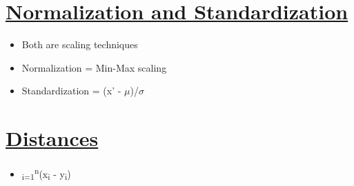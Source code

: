 \documentclass[11pt]{article}
\begin{document}
\section{\underline{Normalization and Standardization}}
\label{sec:org8e8afef}

\begin{itemize}
\item Both are scaling techniques
\item Normalization = Min-Max scaling
\item Standardization = (x' - \(\mu\))/\(\sigma\)
\end{itemize}

\section{\underline{Distances}}
\label{sec:org3299ef2}

\begin{itemize}
\item \Sum\textsubscript{i=1}\textsuperscript{n}(x\textsubscript{i} - y\textsubscript{i})
\end{itemize}
\end{document}
